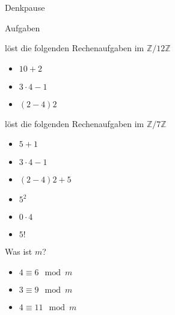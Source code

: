 {
\begin{frame}[fragile]{Denkpause}
    \footnotesize
    \begin{alertblock}{Aufgaben}
    \end{alertblock}
    \begin{block}{löst die folgenden Rechenaufgaben im $\mathbb Z/12\mathbb Z$}
        \begin{multicols}{3}
            \begin{itemize}
                \item $10 + 2$
                \item $3\cdot4-1$
                \item $(2-4)2$
            \end{itemize}
        \end{multicols}
    \end{block}
    \begin{block}{löst die folgenden Rechenaufgaben im $\mathbb Z/7\mathbb Z$}
        \begin{multicols}{3}
            \begin{itemize}
                \item $5 + 1$
                \item $3\cdot4-1$
                \item $(2-4)2+5$
                \item $5^2$
                \item $0\cdot4$
                \item $5!$
            \end{itemize}
        \end{multicols}
    \end{block}
    \begin{block}{Was ist $m$?}
        \begin{multicols}{3}
            \begin{itemize}
                \item $4 \equiv 6 \mod m$
                \item $3 \equiv 9 \mod m$
                \item $4 \equiv 11 \mod m$
            \end{itemize}
        \end{multicols}
    \end{block}
\end{frame}

}
